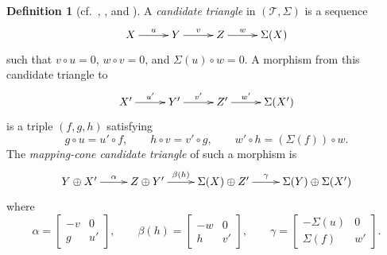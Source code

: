 \documentclass[a4paper,11pt,reqno]{amsart}
\theoremstyle{definition}
\newtheorem{definition}[definition]{Definition}
\theoremstyle{plain}
\numberwithin{equation}{section}
\newcommand{\T}{\mathcal T}
\begin{document}
\begin{definition}[{\normalfont cf.~\cite[Definition~2.2]{ChenLiuLuZhang2026},
\cite[Definitions~1.1.1--1.1.2]{Neeman2001}, and \cite{Puppe1967}}]
\label{def:pretriangulation}
A \emph{candidate triangle} in $(\T,\Sigma)$ is a sequence
\begin{equation*}
\xymatrix@C=2.2pc{
 X\ar[r]^-{u}&Y\ar[r]^-{v}&Z\ar[r]^-{w}&\Sigma(X)
}
\end{equation*}
such that \(v\circ u=0\), \(w\circ v=0\), and
\(\Sigma(u)\circ w=0\).
A morphism from this candidate triangle to
\begin{equation*}
	\xymatrix@C=2.2pc{
		X'\ar[r]^-{u'}&Y'\ar[r]^-{v'}&Z'\ar[r]^-{w'}&\Sigma(X')
	}
\end{equation*}
is a triple $(f,g,h)$ satisfying
\[
 g\circ u=u'\circ f,\qquad h\circ v=v'\circ g,\qquad
 w'\circ h=(\Sigma(f))\circ w.
\]
The \emph{mapping-cone candidate triangle} of such a morphism is
\begin{equation}
\label{eq:mapping-cone}
\xymatrix@C=2.0pc{
Y\oplus X'\ar[r]^-{\alpha}&Z\oplus Y'\ar[r]^-{\beta(h)}&
\Sigma(X)\oplus Z'\ar[r]^-{\gamma}&
\Sigma(Y)\oplus\Sigma(X')
}
\end{equation}
where
\begin{equation}
\label{eq:cone-matrices}
 \alpha=
 \begin{bmatrix}-v&0\\ g&u'\end{bmatrix},\qquad
 \beta(h)=
 \begin{bmatrix}-w&0\\ h&v'\end{bmatrix},\qquad
 \gamma=
 \begin{bmatrix}-\Sigma(u)&0\\ \Sigma(f)&w'\end{bmatrix}.
\end{equation}


\end{definition}
\end{document}
